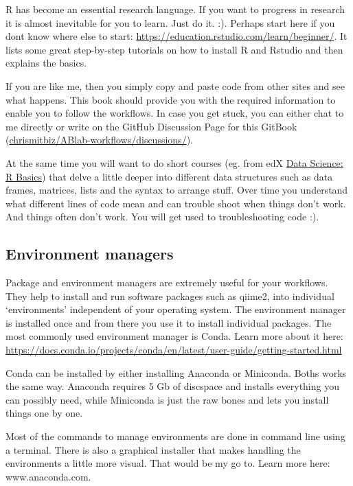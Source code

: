 \documentclass[
]{book}
\begin{document}
R has become an essential research language. If you want to progress in research it is almost inevitable for you to learn. Just do it. :). Perhaps start here if you dont know where else to start: \url{https://education.rstudio.com/learn/beginner/}. It lists some great step-by-step tutorials on how to install R and Rstudio and then explains the basics.

If you are like me, then you simply copy and paste code from other sites and see what happens. This book should provide you with the required information to enable you to follow the workflows. In case you get stuck, you can either chat to me directly or write on the GitHub Discussion Page for this GitBook (\href{(https://github.com/chrismitbiz/ABlab-workflows/discussions/)}{chrismitbiz/ABlab-workflows/discussions/}).

At the same time you will want to do short courses (eg. from edX \href{https://www.edx.org/course/data-science-r-basics}{Data Science: R Basics}) that delve a little deeper into different data structures such as data frames, matrices, lists and the syntax to arrange stuff. Over time you understand what different lines of code mean and can trouble shoot when things don't work. And things often don't work. You will get used to troubleshooting code :).

\hypertarget{environment-managers}{%
\subsection{Environment managers}\label{environment-managers}}

Package and environment managers are extremely useful for your workflows. They help to install and run software packages such as qiime2, into individual `environments' independent of your operating system. The environment manager is installed once and from there you use it to install individual packages. The most commonly used environment manager is Conda. Learn more about it here: \url{https://docs.conda.io/projects/conda/en/latest/user-guide/getting-started.html}

Conda can be installed by either installing Anaconda or Miniconda. Boths works the same way. Anaconda requires 5 Gb of discspace and installs everything you can possibly need, while Miniconda is just the raw bones and lets you install things one by one.

Most of the commands to manage environments are done in command line using a terminal. There is also a graphical installer that makes handling the environments a little more visual. That would be my go to. Learn more here: www.anaconda.com.
\end{document}
